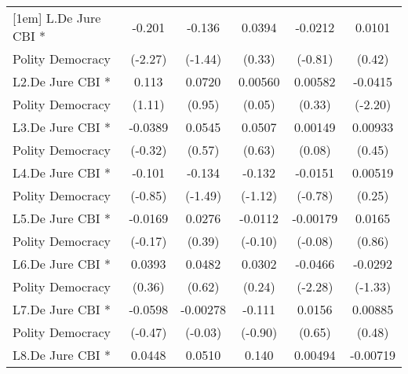 {\begin{tabular}{l*{5}{c}}
[1em]
L.De Jure CBI *     &      -0.201\sym{*}  &      -0.136         &      0.0394         &     -0.0212         &      0.0101         \\
Polity Democracy    &     (-2.27)         &     (-1.44)         &      (0.33)         &     (-0.81)         &      (0.42)         \\
[1em]
L2.De Jure CBI *    &       0.113         &      0.0720         &     0.00560         &     0.00582         &     -0.0415\sym{*}  \\
Polity Democracy    &      (1.11)         &      (0.95)         &      (0.05)         &      (0.33)         &     (-2.20)         \\
[1em]
L3.De Jure CBI *    &     -0.0389         &      0.0545         &      0.0507         &     0.00149         &     0.00933         \\
Polity Democracy    &     (-0.32)         &      (0.57)         &      (0.63)         &      (0.08)         &      (0.45)         \\
[1em]
L4.De Jure CBI *    &      -0.101         &      -0.134         &      -0.132         &     -0.0151         &     0.00519         \\
Polity Democracy    &     (-0.85)         &     (-1.49)         &     (-1.12)         &     (-0.78)         &      (0.25)         \\
[1em]
L5.De Jure CBI *    &     -0.0169         &      0.0276         &     -0.0112         &    -0.00179         &      0.0165         \\
Polity Democracy    &     (-0.17)         &      (0.39)         &     (-0.10)         &     (-0.08)         &      (0.86)         \\
[1em]
L6.De Jure CBI *    &      0.0393         &      0.0482         &      0.0302         &     -0.0466\sym{*}  &     -0.0292         \\
Polity Democracy    &      (0.36)         &      (0.62)         &      (0.24)         &     (-2.28)         &     (-1.33)         \\
[1em]
L7.De Jure CBI *    &     -0.0598         &    -0.00278         &      -0.111         &      0.0156         &     0.00885         \\
Polity Democracy    &     (-0.47)         &     (-0.03)         &     (-0.90)         &      (0.65)         &      (0.48)         \\
[1em]
L8.De Jure CBI *    &      0.0448         &      0.0510         &       0.140         &     0.00494         &    -0.00719         \\

\end{tabular}}
